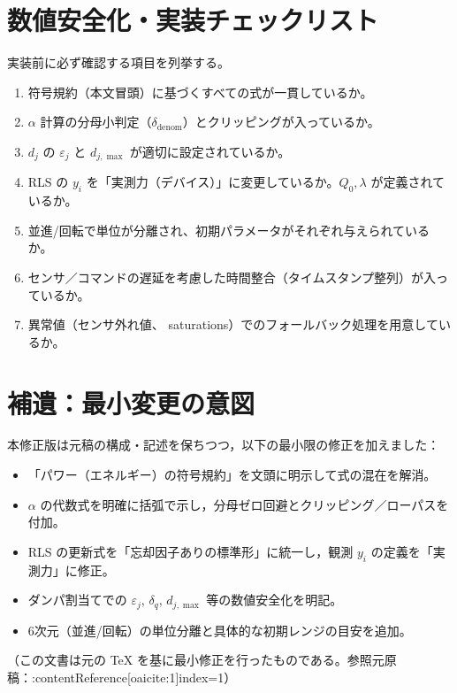 \documentclass[a4paper,11pt]{article}
\begin{document}
\section{数値安全化・実装チェックリスト}
実装前に必ず確認する項目を列挙する。
\begin{enumerate}
  \item 符号規約（本文冒頭）に基づくすべての式が一貫しているか。
  \item $\alpha$ 計算の分母小判定（$\delta_{\text{denom}}$）とクリッピングが入っているか。
  \item $d_j$ の $\varepsilon_j$ と $d_{j,\max}$ が適切に設定されているか。
  \item RLS の $y_i$ を「実測力（デバイス）」に変更しているか。$Q_0,\lambda$ が定義されているか。
  \item 並進/回転で単位が分離され、初期パラメータがそれぞれ与えられているか。
  \item センサ／コマンドの遅延を考慮した時間整合（タイムスタンプ整列）が入っているか。
  \item 異常値（センサ外れ値、 saturations）でのフォールバック処理を用意しているか。
\end{enumerate}

\section*{補遺：最小変更の意図}
本修正版は元稿の構成・記述を保ちつつ，以下の最小限の修正を加えました：
\begin{itemize}
  \item 「パワー（エネルギー）の符号規約」を文頭に明示して式の混在を解消。
  \item $\alpha$ の代数式を明確に括弧で示し，分母ゼロ回避とクリッピング／ローパスを付加。
  \item RLS の更新式を「忘却因子ありの標準形」に統一し，観測 $y_i$ の定義を「実測力」に修正。
  \item ダンパ割当てでの $\varepsilon_j$, $\delta_q$, $d_{j,\max}$ 等の数値安全化を明記。
  \item 6次元（並進/回転）の単位分離と具体的な初期レンジの目安を追加。
\end{itemize}

\vspace{1em}
\noindent
（この文書は元の TeX を基に最小修正を行ったものである。参照元原稿：:contentReference[oaicite:1]{index=1}）
\end{document}
